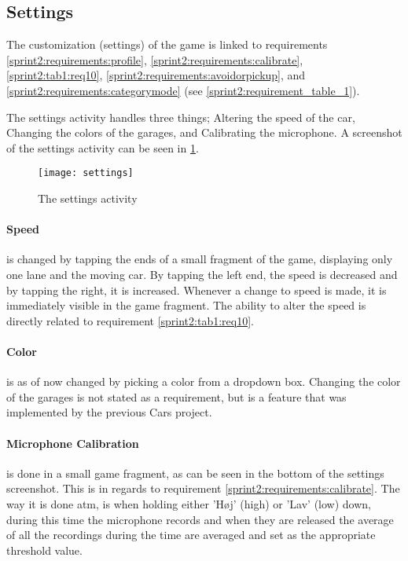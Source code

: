 \subsection{Settings}

The customization (settings) of the game is linked to requirements \ref{sprint2:requirements:profile}, \ref{sprint2:requirements:calibrate}, \ref{sprint2:tab1:req10}, \ref{sprint2:requirements:avoidorpickup}, and \ref{sprint2:requirements:categorymode} (see \cref{sprint2:requirement_table_1}).

The settings activity handles three things; Altering the speed of the car, Changing the colors of the garages, and Calibrating the microphone.
A screenshot of the settings activity can be seen in \cref{sprint2:settings:fig}.
\begin{center}
\begin{figure}
\texttt{[image: settings]}
\caption{The settings activity}
\label{sprint2:settings:fig}
\end{figure}
\end{center}
\paragraph{Speed} is changed by tapping the ends of a small fragment of the game, displaying only one lane and the moving car.
By tapping the left end, the speed is decreased and by tapping the right, it is increased.
Whenever a change to speed is made, it is immediately visible in the game fragment.
The ability to alter the speed is directly related to requirement \ref{sprint2:tab1:req10}.

\paragraph{Color} is as of now changed by picking a color from a dropdown box.
Changing the color of the garages is not stated as a requirement, but is a feature that was implemented by the previous Cars project.

\paragraph{Microphone Calibration} is done in a small game fragment, as can be seen in the bottom of the settings screenshot.
This is in regards to requirement \ref{sprint2:requirements:calibrate}.
The way it is done atm, is when holding either 'H\o j' (high) or 'Lav' (low) down, during this time the microphone records and when they are released the average of all the recordings during the time are averaged and set as the appropriate threshold value.


